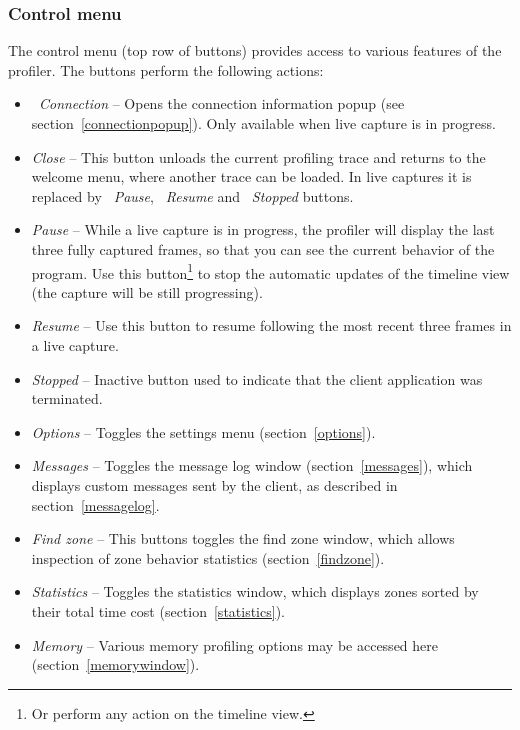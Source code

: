 \documentclass[hidelinks,titlepage,a4paper]{article}
\begin{document}
\subsubsection{Control menu}
\label{controlmenu}

The control menu (top row of buttons) provides access to various features of the profiler. The buttons perform the following actions:

\begin{itemize}
\item \emph{\faWifi{}~Connection} -- Opens the connection information popup (see section~\ref{connectionpopup}). Only available when live capture is in progress.
\item \emph{\faPowerOff{} Close} -- This button unloads the current profiling trace and returns to the welcome menu, where another trace can be loaded. In live captures it is replaced by \emph{\faPause{}~Pause}, \emph{\faPlay{}~Resume} and \emph{\faSquare{}~Stopped} buttons.
\item \emph{\faPause{} Pause} -- While a live capture is in progress, the profiler will display the last three fully captured frames, so that you can see the current behavior of the program. Use this button\footnote{Or perform any action on the timeline view.} to stop the automatic updates of the timeline view (the capture will be still progressing).
\item \emph{\faPlay{} Resume} -- Use this button to resume following the most recent three frames in a live capture.
\item \emph{\faSquare{} Stopped} -- Inactive button used to indicate that the client application was terminated.
\item \emph{\faCog{} Options} -- Toggles the settings menu (section~\ref{options}).
\item \emph{\faTags{} Messages} -- Toggles the message log window (section~\ref{messages}), which displays custom messages sent by the client, as described in section~\ref{messagelog}.
\item \emph{\faSearch{} Find zone} -- This buttons toggles the find zone window, which allows inspection of zone behavior statistics (section~\ref{findzone}).
\item \emph{\faSortAmountUp{} Statistics} -- Toggles the statistics window, which displays zones sorted by their total time cost (section~\ref{statistics}).
\item \emph{\faMemory{} Memory} -- Various memory profiling options may be accessed here (section~\ref{memorywindow}).

\end{itemize}
\end{document}
